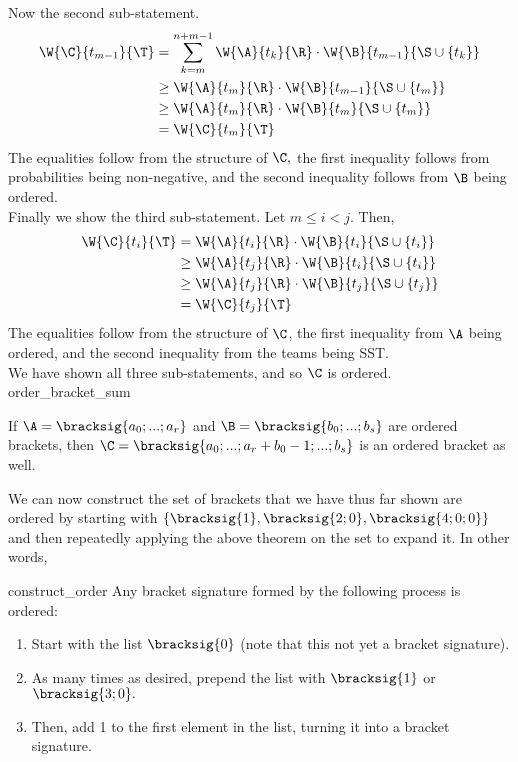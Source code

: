 {{Now the second sub-statement.
\begin{align*}
    \W{\C}{t_{m-1}}{\T} &= \sum_{k=m}^{n+m-1} \W{\A}{t_k}{\R} \cdot \W{\B}{t_{m-1}}{\S \cup \{t_k\}}\\
    &\geq \W{\A}{t_m}{\R} \cdot \W{\B}{t_{m-1}}{\S \cup \{t_m\}}\\
    &\geq \W{\A}{t_m}{\R} \cdot \W{\B}{t_{m}}{\S \cup \{t_m\}}\\
    &= \W{\C}{t_{m}}{\T}
\end{align*}
The equalities follow from the structure of $\C,$ the first inequality follows from probabilities being non-negative, and the second inequality follows from $\B$ being ordered.\\

Finally we show the third sub-statement. Let $m \leq i < j.$ Then,
\begin{align*}
    \W{\C}{t_i}{\T} &= \W{\A}{t_i}{\R} \cdot \W{\B}{t_i}{\S \cup \{t_i\}}\\
    &\geq \W{\A}{t_j}{\R} \cdot \W{\B}{t_i}{\S \cup \{t_i\}}\\
    &\geq \W{\A}{t_j}{\R} \cdot \W{\B}{t_j}{\S \cup \{t_j\}}\\
    &= \W{\C}{t_j}{\T}
\end{align*}
The equalities follow from the structure of $\C$, the first inequality from $\A$ being ordered, and the second inequality from the teams being SST.\\

We have shown all three sub-statements, and so $\C$ is ordered.
}{order_bracket_sum}

\begin{corollary}{}{}
    If $\A = \bracksig{a_0; ...; a_r}$ and $\B = \bracksig{b_0; ...; b_s}$ are ordered brackets, then $\C = \bracksig{a_0; ...; a_r + b_0 - 1; ...; b_s}$ is an ordered bracket as well.
\end{corollary}

We can now construct the set of brackets that we have thus far shown are ordered by starting with $\{\bracksig{1}, \bracksig{2; 0}, \bracksig{4; 0; 0}\}$ and then repeatedly applying the above theorem on the set to expand it. In other words,

\begin{corollary}{}{construct_order}
    Any bracket signature formed by the following process is ordered:
    \begin{enumerate}
        \item Start with the list $\bracksig{0}$ (note that this not yet a bracket signature).
        \item As many times as desired, prepend the list with $\bracksig{1}$ or $\bracksig{3; 0}.$
        \item Then, add 1 to the first element in the list, turning it into a bracket signature.
    \end{enumerate}
\end{corollary}

}
